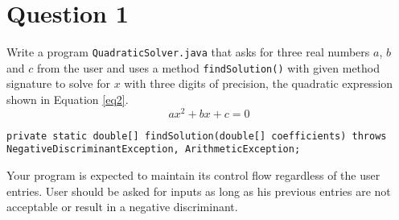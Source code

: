 \documentclass[12pt,letterpaper,twoside]{article}
\begin{document}


\section*{Question 1}

Write a program \texttt{QuadraticSolver.java} that asks for three real numbers $a$, $b$ and $c$ from the user and uses a method \texttt{findSolution()} with given method signature to solve for $x$ with three digits of precision, the quadratic expression shown in Equation \ref{eq2}.
\begin{equation}
ax^2+bx+c=0
\label{eq2}
\end{equation}

\lstset{language=java,tabsize=2,numbers=none}
\begin{lstlisting}
private static double[] findSolution(double[] coefficients) throws NegativeDiscriminantException, ArithmeticException;
\end{lstlisting}

Your program is expected to maintain its control flow regardless of the user entries. User should be asked for inputs as long as his previous entries are not acceptable or result in a negative discriminant.

\end{document}
